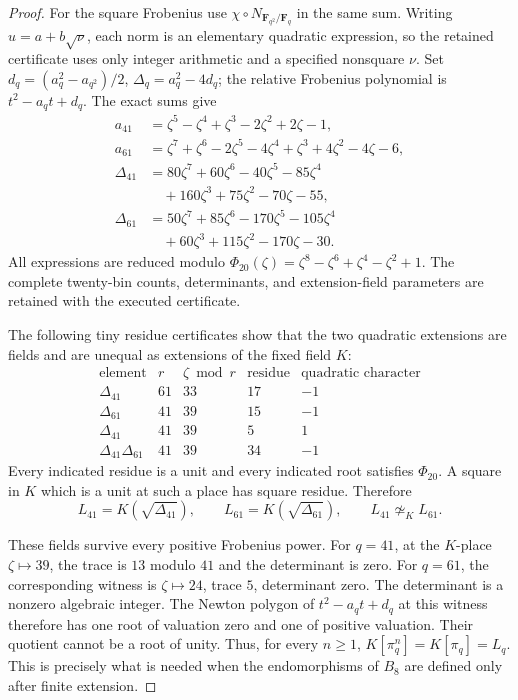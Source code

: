 \begin{proof}
For the square Frobenius use \(\chi\circ N_{\mathbf F_{q^2}/\mathbf F_q}\)
in the same sum. Writing \(u=a+b\sqrt\nu\), each norm is
an elementary quadratic expression, so the retained certificate
uses only integer arithmetic and a specified nonsquare \(\nu\).
Set \(d_q=(a_q^2-a_{q^2})/2\),
\(\Delta_q=a_q^2-4d_q\); the relative Frobenius polynomial is
\(t^2-a_qt+d_q\). The exact sums give
\[
\begin{aligned}
a_{41}&=\zeta^5-\zeta^4+\zeta^3-2\zeta^2+2\zeta-1,\\
a_{61}&=\zeta^7+\zeta^6-2\zeta^5-4\zeta^4
                  +\zeta^3+4\zeta^2-4\zeta-6,\\
\Delta_{41}&=80\zeta^7+60\zeta^6-40\zeta^5-85\zeta^4\\
           &\hspace{1em}+160\zeta^3+75\zeta^2-70\zeta-55,\\
\Delta_{61}&=50\zeta^7+85\zeta^6-170\zeta^5-105\zeta^4\\
           &\hspace{1em}+60\zeta^3+115\zeta^2-170\zeta-30.
\end{aligned}                                                  \tag{A.54.12}
\]
All expressions are reduced modulo
\(\Phi_{20}(\zeta)=\zeta^8-\zeta^6+\zeta^4-\zeta^2+1\).
The complete twenty-bin counts, determinants, and extension-field
parameters are retained with the executed certificate.

The following tiny residue certificates show that the two
quadratic extensions are fields and are unequal as extensions
of the fixed field \(K\):
\[
\begin{array}{c|r|r|r|r}
\text{element}&r&\zeta\bmod r&\text{residue}&
                 \text{quadratic character}\\\hline
\Delta_{41}&61&33&17&-1\\
\Delta_{61}&41&39&15&-1\\
\Delta_{41}&41&39&5&1\\
\Delta_{41}\Delta_{61}&41&39&34&-1
\end{array}                                                     \tag{A.54.13}
\]
Every indicated residue is a unit and every indicated root
satisfies \(\Phi_{20}\). A square in \(K\) which is a unit
at such a place has square residue. Therefore
\[
 L_{41}=K(\sqrt{\Delta_{41}}),\qquad
 L_{61}=K(\sqrt{\Delta_{61}}),\qquad L_{41}\not\simeq_K L_{61}.
                                                               \tag{A.54.14}
\]

These fields survive every positive Frobenius power. For
\(q=41\), at the \(K\)-place \(\zeta\mapsto39\), the
trace is \(13\) modulo \(41\) and the determinant is zero.
For \(q=61\), the corresponding witness is
\(\zeta\mapsto24\), trace \(5\), determinant zero.
The determinant is a nonzero algebraic integer. The Newton
polygon of \(t^2-a_qt+d_q\) at this witness therefore has
one root of valuation zero and one of positive valuation.
Their quotient cannot be a root of unity. Thus, for every
\(n\ge1\), \(K[\pi_q^n]=K[\pi_q]=L_q\).
This is precisely what is needed when the endomorphisms of
\(B_8\) are defined only after finite extension.


\end{proof}

